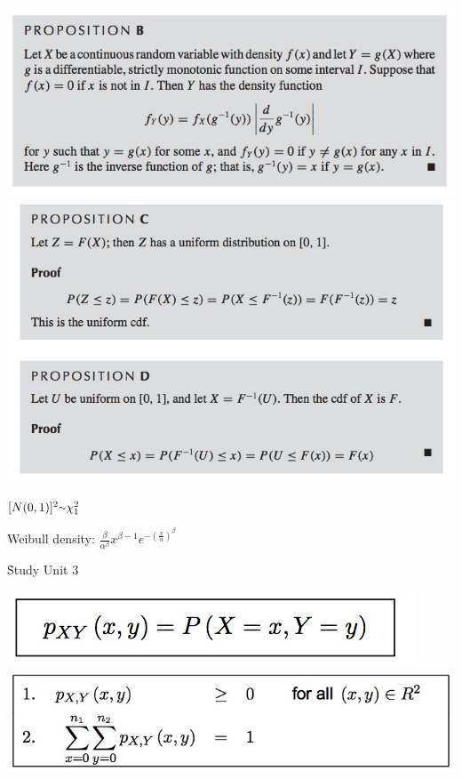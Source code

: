 \documentclass{/out/app/latex/examnotes}
\begin{document}
{\includegraphics[scale=0.6]{./img/2fun1.jpg}
\includegraphics[scale=0.6]{./img/2fun2.jpg}

$[N(0,1)]^2\mytilde \chi^2_1$

Weibull density: $\displaystyle\frac{\beta}{\alpha^\beta}x^{\beta-1}e^{-\left(\displaystyle\frac{x}{\alpha}\right)^\beta}$

\h{Study Unit 3}


\includegraphics[scale=0.4]{./img/3jd1.jpg}
\includegraphics[scale=0.4]{./img/3jd2.jpg}

}
\end{document}
